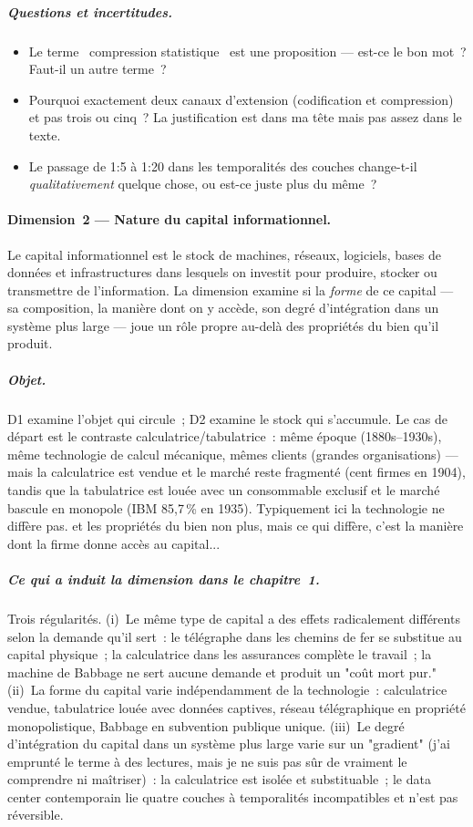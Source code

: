 \subparagraph{Questions et incertitudes.}
\begin{itemize}
\item Le terme \og~compression statistique~\fg{} est une proposition --- est-ce le bon mot~? Faut-il un autre terme~?
\item Pourquoi exactement deux canaux d'extension (codification et compression) et pas trois ou cinq~? La justification est dans ma t\^ete mais pas assez dans le texte.
\item Le passage de 1:5 \`a 1:20 dans les temporalit\'es des couches change-t-il \emph{qualitativement} quelque chose, ou est-ce juste plus du m\^eme~?
\end{itemize}


\paragraph{Dimension~2 --- Nature du capital informationnel.}
Le capital informationnel est le stock de machines, réseaux, logiciels, bases de données et infrastructures dans lesquels on investit pour produire, stocker ou transmettre de l'information. La dimension examine si la \emph{forme} de ce capital --- sa composition, la manière dont on y accède, son degré d'intégration dans un système plus large --- joue un rôle propre au-delà des propriétés du bien qu'il produit.

\subparagraph{Objet.}
D1 examine l'objet qui circule~; D2 examine le stock qui s'accumule. Le cas de départ est le contraste calculatrice/tabulatrice~: même époque (1880s--1930s), même technologie de calcul mécanique, mêmes clients (grandes organisations) --- mais la calculatrice est vendue et le marché reste fragmenté (cent firmes en 1904), tandis que la tabulatrice est louée avec un consommable exclusif et le marché bascule en monopole (IBM 85,7\,\% en 1935). Typiquement ici la technologie ne diffère pas. et les propriétés du bien non plus, mais ce qui diffère, c'est la manière dont la firme donne accès au capital...

\subparagraph{Ce qui a induit la dimension dans le chapitre~1.}
Trois régularités. (i)~Le même type de capital a des effets radicalement différents selon la demande qu'il sert~: le télégraphe dans les chemins de fer se substitue au capital physique~; la calculatrice dans les assurances complète le travail~; la machine de Babbage ne sert aucune demande et produit un "coût mort pur." (ii)~La forme du capital varie indépendamment de la technologie~: calculatrice vendue, tabulatrice louée avec données captives, réseau télégraphique en propriété monopolistique, Babbage en subvention publique unique. (iii)~Le degré d'intégration du capital dans un système plus large varie sur un "gradient" (j'ai emprunté le terme à des lectures, mais je ne suis pas sûr de vraiment le comprendre ni maîtriser)~: la calculatrice est isolée et substituable~; le data center contemporain lie quatre couches à temporalités incompatibles et n'est pas réversible.

